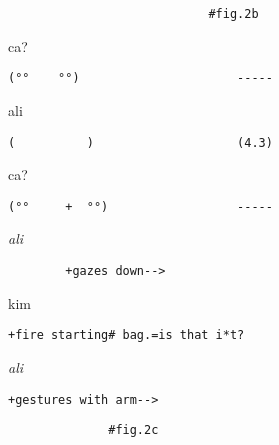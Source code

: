 \documentclass[output=paper,nonflat,modfont,draft]{langsci/langscibook}
\begin{document}
\begin{transbox}{4}{\fig}
\begin{verbatim}
                            #fig.2b
\end{verbatim}
\end{transbox}

\begin{transbox}{5}{ca?}
\begin{verbatim}
(°°    °°)                      -----
\end{verbatim}
\end{transbox}

\begin{transbox}{6}{ali}
\begin{verbatim}
(          )                    (4.3)
\end{verbatim}
\end{transbox}

\begin{transbox}{7}{ca?}
\begin{verbatim}
(°°     +  °°)                  -----
\end{verbatim}
\end{transbox}

\begin{transbox}{8}{\textit{ali}}
\begin{verbatim}
        +gazes down-->
\end{verbatim}
\end{transbox}

\begin{transbox}{9}{kim}
\begin{verbatim}
+fire starting# bag.=is that i*t?
\end{verbatim}
\end{transbox}

\begin{mdframedkendrick}[style=secondfoc]
\begin{transbox}{10}{\textit{ali}}
\begin{verbatim}
+gestures with arm-->
\end{verbatim}
\end{transbox}
\end{mdframedkendrick}\vspace{-5mm}

\begin{transbox}{11}{\fig}
  \begin{verbatim}
              #fig.2c
  \end{verbatim}
\end{transbox}
\end{document}
